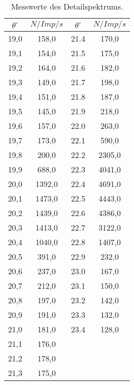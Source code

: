 \begin{table}
  \centering
  \begin{tabular}{c c | c c}
    \toprule
    $\theta^{\circ}$ & $N/Imp/s$ & $\theta^{\circ}$ & $N/Imp/s$ \\
    \midrule
    19,0 &  158,0 & 21.4 &  170,0 \\
    19,1 &  154,0 & 21.5 &  175,0 \\
    19,2 &  164,0 & 21.6 &  182,0 \\
    19,3 &  149,0 & 21.7 &  198,0 \\
    19,4 &  151,0 & 21.8 &  187,0 \\
    19,5 &  145,0 & 21.9 &  218,0 \\
    19,6 &  157,0 & 22.0 &  263,0 \\
    19,7 &  173,0 & 22.1 &  590,0 \\
    19,8 &  200,0 & 22.2 & 2305,0 \\
    19,9 &  688,0 & 22.3 & 4041,0 \\
    20,0 & 1392,0 & 22.4 & 4691,0 \\
    20,1 & 1473,0 & 22.5 & 4443,0 \\
    20,2 & 1439,0 & 22.6 & 4386,0 \\
    20,3 & 1413,0 & 22.7 & 3122,0 \\
    20,4 & 1040,0 & 22.8 & 1407,0 \\
    20,5 &  391,0 & 22.9 &  232,0 \\
    20,6 &  237,0 & 23.0 &  167,0 \\
    20,7 &  212,0 & 23.1 &  150,0 \\
    20,8 &  197,0 & 23.2 &  142,0 \\
    20,9 &  191,0 & 23.3 &  132,0 \\
    21,0 &  181,0 & 23.4 &  128,0 \\
    21,1 &  176,0 & & \\
    21,2 &  178,0 & & \\
    21,3 &  175,0 & & \\
    \bottomrule
  \end{tabular}
  \caption{Messwerte des Detailspektrums.}
  \label{tab:Detailspektrum}
\end{table}

